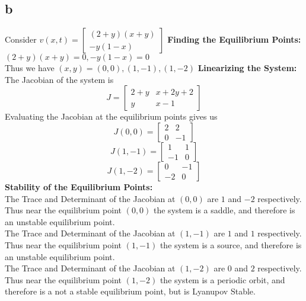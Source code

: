 \documentclass{article}
\begin{document}
\subsection*{b}
Consider $v(x,t) = \begin{bmatrix}
    (2+y)(x+y)\\
    -y(1-x)
\end{bmatrix}$
\textbf{Finding the Equilibrium Points:}\\
$(2+y)(x+y) = 0, -y(1-x)=0$\\
Thus we have $(x,y) = (0,0), (1,-1), (1,-2)$
\textbf{Linearizing the System:}\\
The Jacobian of the system is
$$J = \begin{bmatrix}
    2+y & x+2y+2\\
    y & x-1
\end{bmatrix}$$
Evaluating the Jacobian at the equilibrium points gives us
$$J(0,0) = \begin{bmatrix}
    2 & 2\\
    0 & -1
\end{bmatrix}$$
$$J(1,-1) = \begin{bmatrix}
    1 & 1\\
    -1 & 0
\end{bmatrix}$$
$$J(1,-2) = \begin{bmatrix}
    0 & -1\\
    -2 & 0
\end{bmatrix}$$
\textbf{Stability of the Equilibrium Points:}\\
The Trace and Determinant of the Jacobian at $(0,0)$ are $1$ and $-2$ respectively.\\
Thus near the equilibrium point $(0,0)$ the system is a saddle, and therefore is an unstable equilibrium point.\\
The Trace and Determinant of the Jacobian at $(1,-1)$ are $1$ and $1$ respectively.\\
Thus near the equilibrium point $(1,-1)$ the system is a source, and therefore is an unstable equilibrium point.\\
The Trace and Determinant of the Jacobian at $(1,-2)$ are $0$ and $2$ respectively.\\
Thus near the equilibrium point $(1,-2)$ the system is a periodic orbit, and therefore is a not a stable equilibrium point, but is Lyanupov Stable.\\
\end{document}
